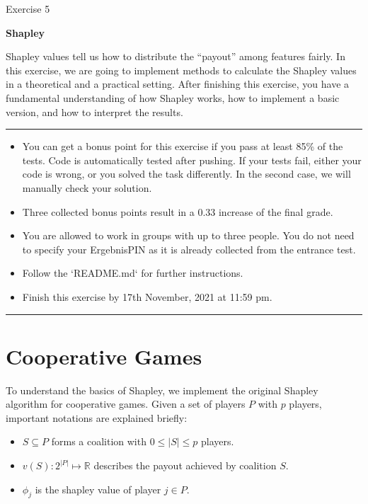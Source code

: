 \documentclass[a4paper]{article}
\begin{document}
{\noindent\LARGE Exercise 5\par}
\vspace{8pt}
{\noindent\huge\textbf{Shapley}}
\vspace{20pt}

\noindent
Shapley values tell us how to distribute the “payout” among features fairly. In this exercise, we are going to implement methods to calculate the Shapley values in a theoretical and a practical setting. After finishing this exercise, you have a fundamental understanding of how Shapley works, how to implement a basic version, and how to interpret the results.


\vspace{10pt}
\par\noindent\rule{\textwidth}{0.2pt}
\begin{itemize}
    \item You can get a bonus point for this exercise if you pass at least 85\% of the tests. Code is automatically tested after pushing. If your tests fail, either your code is wrong, or you solved the task differently. In the second case, we will manually check your solution.
    \item Three collected bonus points result in a 0.33 increase of the final grade.
    \item You are allowed to work in groups with up to three people. You do not need to specify your ErgebnisPIN as it is already collected from the entrance test.
    \item Follow the `README.md` for further instructions.
    \item Finish this exercise by 17th November, 2021 at 11:59 pm.
\end{itemize}
\par\noindent\rule{\textwidth}{0.2pt}
\vspace{8pt}


\section{Cooperative Games}
\label{section:cg}

To understand the basics of Shapley, we implement the original Shapley algorithm for cooperative games. Given a set of players $P$ with $p$ players, important notations are explained briefly:

\begin{itemize}
    \item $S \subseteq P$ forms a coalition with $0 \leq |S| \leq p$ players. 
    \item $v(S): 2^{|P|}\mapsto \mathbb{R}$ describes the payout achieved by coalition $S$.
    \item $\phi_j$ is the shapley value of player $j \in P$.
\end{itemize}
\end{document}
